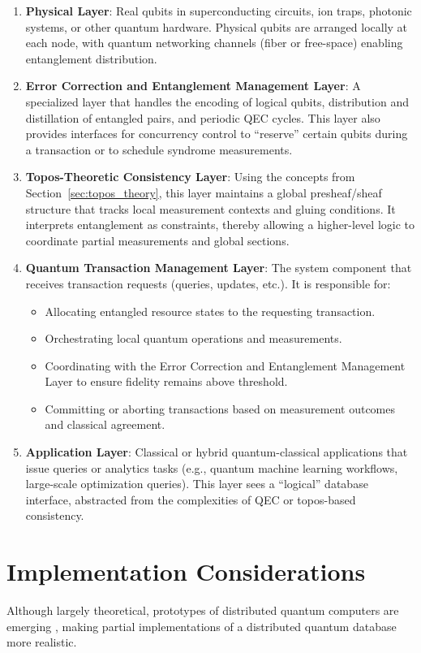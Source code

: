 \documentclass[11pt]{article}
\begin{document}
\begin{enumerate}
    \item \textbf{Physical Layer}: Real qubits in superconducting circuits, ion traps, photonic systems, or other quantum hardware. Physical qubits are arranged locally at each node, with quantum networking channels (fiber or free-space) enabling entanglement distribution.
    \item \textbf{Error Correction and Entanglement Management Layer}: A specialized layer that handles the encoding of logical qubits, distribution and distillation of entangled pairs, and periodic QEC cycles. This layer also provides interfaces for concurrency control to “reserve” certain qubits during a transaction or to schedule syndrome measurements.
    \item \textbf{Topos-Theoretic Consistency Layer}: Using the concepts from Section~\ref{sec:topos_theory}, this layer maintains a global presheaf/sheaf structure that tracks local measurement contexts and gluing conditions. It interprets entanglement as constraints, thereby allowing a higher-level logic to coordinate partial measurements and global sections. 
    \item \textbf{Quantum Transaction Management Layer}: The system component that receives transaction requests (queries, updates, etc.). It is responsible for:
    \begin{itemize}
        \item Allocating entangled resource states to the requesting transaction.
        \item Orchestrating local quantum operations and measurements.
        \item Coordinating with the Error Correction and Entanglement Management Layer to ensure fidelity remains above threshold.
        \item Committing or aborting transactions based on measurement outcomes and classical agreement.
    \end{itemize}
    \item \textbf{Application Layer}: Classical or hybrid quantum-classical applications that issue queries or analytics tasks (e.g., quantum machine learning workflows, large-scale optimization queries). This layer sees a “logical” database interface, abstracted from the complexities of QEC or topos-based consistency.
\end{enumerate}

\section{Implementation Considerations}
\label{sec:implementation}
Although largely theoretical, prototypes of distributed quantum computers are emerging \cite{kimble_quantum_internet}, making partial implementations of a distributed quantum database more realistic. 
\end{document}
